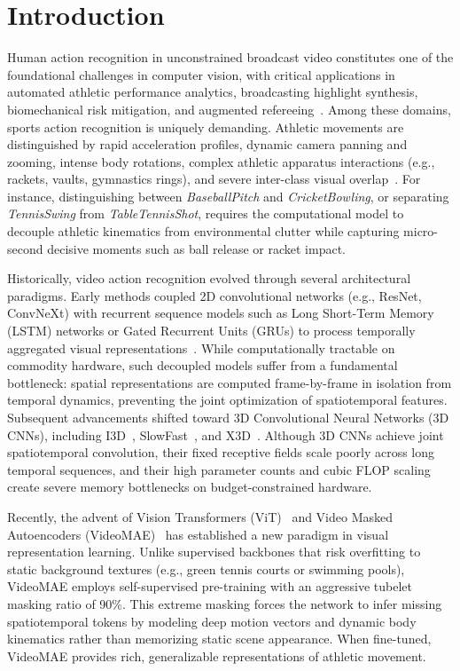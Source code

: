 \section{Introduction}
\label{sec:introduction}

Human action recognition in unconstrained broadcast video constitutes one of the foundational challenges in computer vision, with critical applications in automated athletic performance analytics, broadcasting highlight synthesis, biomechanical risk mitigation, and augmented refereeing~\cite{carreira2017i3d,feichtenhofer2019slowfast}. Among these domains, sports action recognition is uniquely demanding. Athletic movements are distinguished by rapid acceleration profiles, dynamic camera panning and zooming, intense body rotations, complex athletic apparatus interactions (e.g., rackets, vaults, gymnastics rings), and severe inter-class visual overlap~\cite{soomro2012ucf101}. For instance, distinguishing between \textit{BaseballPitch} and \textit{CricketBowling}, or separating \textit{TennisSwing} from \textit{TableTennisShot}, requires the computational model to decouple athletic kinematics from environmental clutter while capturing micro-second decisive moments such as ball release or racket impact.

Historically, video action recognition evolved through several architectural paradigms. Early methods coupled 2D convolutional networks (e.g., ResNet, ConvNeXt) with recurrent sequence models such as Long Short-Term Memory (LSTM) networks or Gated Recurrent Units (GRUs) to process temporally aggregated visual representations~\cite{donahue2015long}. While computationally tractable on commodity hardware, such decoupled models suffer from a fundamental bottleneck: spatial representations are computed frame-by-frame in isolation from temporal dynamics, preventing the joint optimization of spatiotemporal features. Subsequent advancements shifted toward 3D Convolutional Neural Networks (3D CNNs), including I3D~\cite{carreira2017i3d}, SlowFast~\cite{feichtenhofer2019slowfast}, and X3D~\cite{feichtenhofer2020x3d}. Although 3D CNNs achieve joint spatiotemporal convolution, their fixed receptive fields scale poorly across long temporal sequences, and their high parameter counts and cubic FLOP scaling create severe memory bottlenecks on budget-constrained hardware.

Recently, the advent of Vision Transformers (ViT)~\cite{dosovitskiy2020vit} and Video Masked Autoencoders (VideoMAE)~\cite{tong2022videomae,wang2023videomaev2} has established a new paradigm in visual representation learning. Unlike supervised backbones that risk overfitting to static background textures (e.g., green tennis courts or swimming pools), VideoMAE employs self-supervised pre-training with an aggressive tubelet masking ratio of 90\%. This extreme masking forces the network to infer missing spatiotemporal tokens by modeling deep motion vectors and dynamic body kinematics rather than memorizing static scene appearance. When fine-tuned, VideoMAE provides rich, generalizable representations of athletic movement.

